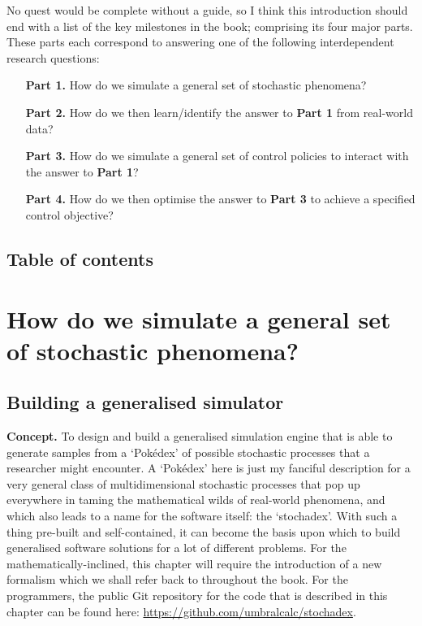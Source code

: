\documentclass{book}
\begin{document}
No quest would be complete without a guide, so I think this introduction should end with a list of the key milestones in the book; comprising its four major parts. These parts each correspond to answering one of the following interdependent research questions:

\begin{enumerate}[leftmargin=2.5\parindent] 
\item[{\bfseries\sffamily Part 1.}]{How do we simulate a general set of stochastic phenomena?}
\item[{\bfseries\sffamily Part 2.}]{How do we then learn/identify the answer to {\bfseries\sffamily Part 1} from real-world data?}
\item[{\bfseries\sffamily Part 3.}]{How do we simulate a general set of control policies to interact with the answer to {\bfseries\sffamily Part 1}?}
\item[{\bfseries\sffamily Part 4.}]{How do we then optimise the answer to {\bfseries\sffamily Part 3} to achieve a specified control objective?} 
\end{enumerate}



\chapter*{Table of contents}
\vspace*{-3cm}
{\sffamily \tableofcontents}
\mainmatter


\part*{{ How do we simulate a general set of stochastic phenomena?}}


\chapter{\sffamily Building a generalised simulator}

{\bfseries\sffamily Concept.} To design and build a generalised simulation engine that is able to generate samples from a `Pokédex' of possible stochastic processes that a researcher might encounter. A `Pokédex' here is just my fanciful description for a very general class of multidimensional stochastic processes that pop up everywhere in taming the mathematical wilds of real-world phenomena, and which also leads to a name for the software itself: the `stochadex'. With such a thing pre-built and self-contained, it can become the basis upon which to build generalised software solutions for a lot of different problems. For the mathematically-inclined, this chapter will require the introduction of a new formalism which we shall refer back to throughout the book. For the programmers, the public Git repository for the code that is described in this chapter can be found here: \href{https://github.com/umbralcalc/stochadex}{https://github.com/umbralcalc/stochadex}.
\end{document}
